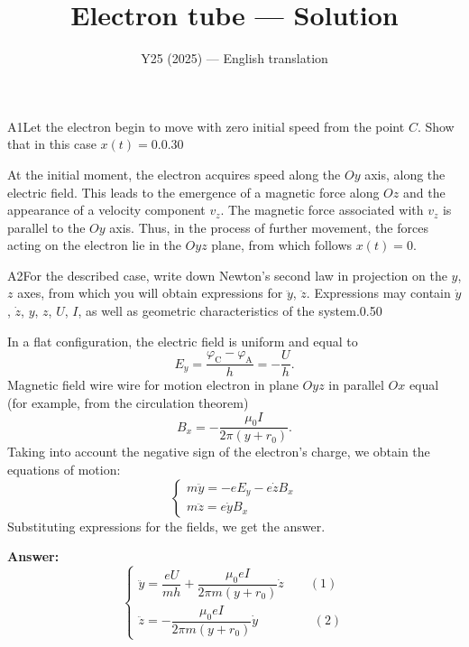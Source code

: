 \documentclass[11pt,a4paper]{article}
\title{\textbf{Electron tube --- Solution}}
\author{\normalsize Y25 (2025) — English translation}
\date{}
\begin{document}
\maketitle\vspace{-0.5em}
\begin{solcard}{A1}{Let the electron begin to move with zero initial speed from the point $C$. Show that in this case $x(t) = 0$.}{0.30}

At the initial moment, the electron acquires speed along the $Oy$ axis, along the electric field. This leads to the emergence of a magnetic force along $Oz$ and the appearance of a velocity component $v_z$. The magnetic force associated with $v_z$ is parallel to the $Oy$ axis. Thus, in the process of further movement, the forces acting on the electron lie in the $Oyz$ plane, from which follows $x(t) = 0$.

\end{solcard}

\begin{solcard}{A2}{For the described case, write down Newton’s second law in projection on the $y$, $z$ axes, from which you will obtain expressions for $\ddot{y}$, $\ddot{z}$. Expressions may contain $\dot{y}$, $\dot{z}$, $y$, $z$, $U$, $I$, as well as geometric characteristics of the system.}{0.50}

In a flat configuration, the electric field is uniform and equal to $$E_y = \frac{\varphi_\text{C} - \varphi_\text{A}}{h} = -\frac{U}{h}.$$Magnetic field wire wire for motion electron in plane $Oyz$ in parallel $Ox$ equal (for example, from the circulation theorem) $$B_x = -\frac{\mu_0 I}{2\pi(y+r_0)}.$$ Taking into account the negative sign of the electron's charge, we obtain the equations of motion: $$\begin{cases} m \ddot{y} = -eE_y - e\dot{z}B_x \\ m\ddot{z} = e\dot{y}B_x \end{cases}$$Substituting expressions for the fields, we get the answer.

\par\smallskip\noindent\textbf{Answer:} $$\begin{cases} \ddot{y} = \dfrac{e U}{m h} + \dfrac{\mu_0 e I}{2\pi m (y+r_0)}\dot{z} \qquad  (1)\\ \ddot{z} = -\dfrac{\mu_0 e I}{2 \pi m (y+r_0)}\dot{y} \qquad \qquad \ \, (2) \end{cases}$$
\end{solcard}
\end{document}
